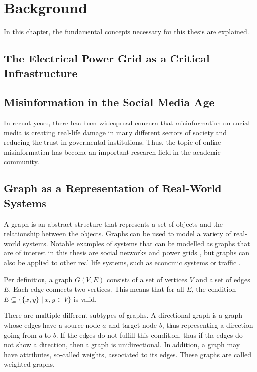\chapter{Background}
\label{background}

In this chapter, the fundamental concepts necessary for this thesis are explained.

\section{The Electrical Power Grid as a Critical Infrastructure}

\section{Misinformation in the Social Media Age}

In recent years, there has been widespread concern that 
misinformation on social media is creating real-life damage in 
many different sectors of society and reducing the trust in govermental
institutions. Thus, the topic of online misinformation has become an 
important research field in the academic community.



\section{Graph as a Representation of Real-World Systems}

A graph is an abstract structure that represents a set of objects and the relationship 
between the objects. Graphs can be used to model a variety of real-world systems.
Notable examples of systems that can be modelled as graphs that are of 
interest in this thesis are social networks 
\cite{socialgraphexample} and power grids \cite{powergraphexample}, but graphs can 
also be applied to other real life systems, such as economic systems \cite{economicsgraph} 
or traffic .

Per definition, a graph $G(V, E)$ consists of a set of vertices $V$ and a 
set of edges $E$. Each edge connects two vertices. This means that for all $E$, the 
condition  $E \subseteq\{ \{x, y\} \mid x, y \in V  \}$ 
is valid.

There are multiple different subtypes of graphs. A directional graph is a graph 
whose edges have a source node $a$ and target node $b$, thus representing
a direction going from $a$ to $b$. If the edges do not fulfill this 
condition, thus if the edges do not show a direction, then a graph is unidirectional.
In addition, a graph may have attributes, so-called weights, associated to its edges.
These graphs are called weighted graphs.

